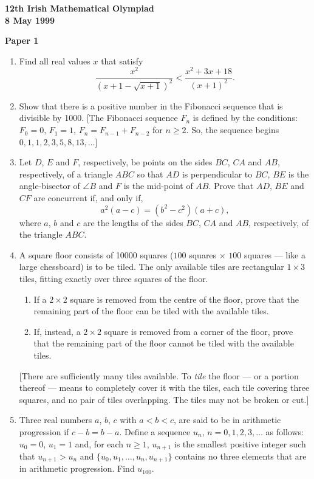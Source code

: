 \documentclass[12pt]{article}
\begin{document}
\begin{center}
{\large\bfseries 12th Irish Mathematical Olympiad\\8 May 1999}
\end{center}
\bigskip\noindent\textbf{Paper 1}\bigskip
\begin{enumerate}
\item Find all real values $x$ that satisfy
\[
\frac{x^2}{(x + 1 - \sqrt{x+1})^2} < \frac{x^2 + 3x + 18}{(x+1)^2}.
\]

\item Show that there is a positive number in the Fibonacci sequence that is divisible by 1000.
[The Fibonacci sequence $F_n$ is defined by the conditions:
$F_0 = 0$, $F_1 = 1$, $F_n = F_{n-1} + F_{n-2}$ for $n \geq 2$.
So, the sequence begins $0, 1, 1, 2, 3, 5, 8, 13, \ldots$]

\item Let $D$, $E$ and $F$, respectively, be points on the sides $BC$, $CA$ and $AB$, respectively, of a triangle $ABC$ so that $AD$ is perpendicular to $BC$, $BE$ is the angle-bisector of $\angle B$ and $F$ is the mid-point of $AB$. Prove that $AD$, $BE$ and $CF$ are concurrent if, and only if,
\[
a^2(a - c) = (b^2 - c^2)(a + c),
\]
where $a$, $b$ and $c$ are the lengths of the sides $BC$, $CA$ and $AB$, respectively, of the triangle $ABC$.

\item A square floor consists of 10000 squares ($100$ squares $\times$ $100$ squares --- like a large chessboard) is to be tiled. The only available tiles are rectangular $1 \times 3$ tiles, fitting exactly over three squares of the floor.
\begin{enumerate}
\item[(a)] If a $2 \times 2$ square is removed from the centre of the floor, prove that the remaining part of the floor can be tiled with the available tiles.
\item[(b)] If, instead, a $2 \times 2$ square is removed from a corner of the floor, prove that the remaining part of the floor cannot be tiled with the available tiles.
\end{enumerate}
[There are sufficiently many tiles available. To \textit{tile} the floor --- or a portion thereof --- means to completely cover it with the tiles, each tile covering three squares, and no pair of tiles overlapping. The tiles may not be broken or cut.]

\item Three real numbers $a$, $b$, $c$ with $a < b < c$, are said to be in arithmetic progression if $c - b = b - a$.
Define a sequence $u_n$, $n = 0, 1, 2, 3, \ldots$ as follows: $u_0 = 0$, $u_1 = 1$ and, for each $n \geq 1$, $u_{n+1}$ is the smallest positive integer such that $u_{n+1} > u_n$ and $\{u_0, u_1, \ldots, u_n, u_{n+1}\}$ contains no three elements that are in arithmetic progression.
Find $u_{100}$.

\end{enumerate}
\end{document}
